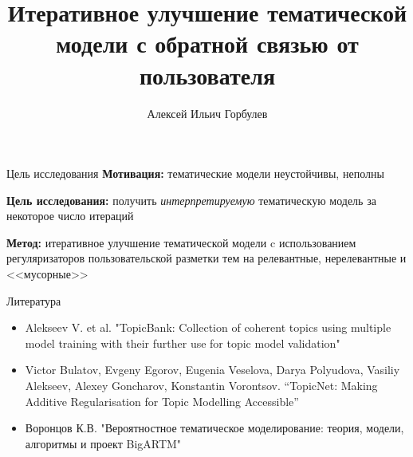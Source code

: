 \documentclass{beamer}
\title[\hbox to 56mm{Итеративное улучшение}]{Итеративное улучшение тематической \\ модели с обратной связью от пользователя}
\author[А.\,И. Горбулев]{Алексей Ильич Горбулев}
\institute{Московский физико-технический институт}
\date{\footnotesize
\par\smallskip\emph{Курс:} Моя первая научная статья/Группа Б05-021а
\par\smallskip\emph{Эксперт:} д. ф.-м. н. К.\,В.~Воронцов
\par\smallskip\emph{Консультант:} В.\,А.~Алексеев
\par\bigskip\small 2023}
\begin{document}
\begin{frame}
\thispagestyle{empty}
\maketitle
\end{frame}

\begin{frame}{Цель исследования}
    \textbf{Мотивация:} тематические модели неустойчивы, неполны

    \textbf{Цель исследования:} получить \textit{интерпретируемую} тематическую модель за некоторое число итераций

    \textbf{Метод:} итеративное улучшение тематической модели c использованием регуляризаторов пользовательской разметки тем на релевантные, нерелевантные и <<мусорные>>
\end{frame}

\begin{frame}{Литература}
\begin{itemize}
    \item Alekseev V. et al. "TopicBank: Collection of coherent topics using multiple model training with their further use for topic model validation"
    \item Victor Bulatov, Evgeny Egorov, Eugenia Veselova, Darya Polyudova, Vasiliy Alekseev, Alexey Goncharov, Konstantin Vorontsov. “TopicNet: Making Additive Regularisation for Topic Modelling Accessible”
    \item Воронцов К.В. "Вероятностное тематическое моделирование: теория, модели, алгоритмы и проект BigARTM"
\end{itemize}
\end{frame}
\end{document}
